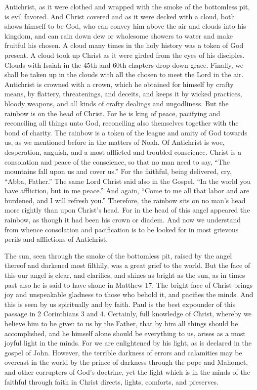 Antichrist, as it were clothed and wrapped with the smoke of the bottomless pit, is evil favored. And Christ covered and as it were decked with a cloud, both shows himself to be God, who can convey him above the air and clouds into his kingdom, and can rain down dew or wholesome showers to water and make fruitful his chosen. A cloud many times in the holy history was a token of God present. A cloud took up Christ as it were girded from the eyes of his disciples. Clouds with Isaiah in the 45th and 60th chapters drop down grace. Finally, we shall be taken up in the clouds with all the chosen to meet the Lord in the air. Antichrist is crowned with a crown, which he obtained for himself by crafty means, by flattery, threatenings, and deceits, and keeps it by wicked practices, bloody weapons, and all kinds of crafty dealings and ungodliness. But the rainbow is on the head of Christ. For he is king of peace, pacifying and reconciling all things unto God, reconciling also themselves together with the bond of charity. The rainbow is a token of the league and amity of God towards us, as we mentioned before in the matters of Noah. Of Antichrist is woe, desperation, anguish, and a most afflicted and troubled conscience. Christ is a consolation and peace of the conscience, so that no man need to say, “The mountains fall upon us and cover us.” For the faithful, being delivered, cry, “Abba, Father.” The same Lord Christ said also in the Gospel, “In the world you have affliction, but in me peace.” And again, “Come to me all that labor and are burdened, and I will refresh you.” Therefore, the rainbow sits on no man’s head more rightly than upon Christ’s head. For in the head of this angel appeared the rainbow, as though it had been his crown or diadem. And now we understand from whence consolation and pacification is to be looked for in most grievous perils and afflictions of Antichrist.

The sun, seen through the smoke of the bottomless pit, raised by the angel thereof and darkened most filthily, was a great grief to the world. But the face of this our angel is clear, and clarifies, and shines as bright as the sun, as in times past also he is said to have shone in Matthew 17. The bright face of Christ brings joy and unspeakable gladness to those who behold it, and pacifies the minds. And this is seen by us spiritually and by faith. Paul is the best expounder of this passage in 2 Corinthians 3 and 4. Certainly, full knowledge of Christ, whereby we believe him to be given to us by the Father, that by him all things should be accomplished, and he himself alone should be everything to us, arises as a most joyful light in the minds. For we are enlightened by his light, as is declared in the gospel of John. However, the terrible darkness of errors and calamities may be overcast in the world by the prince of darkness through the pope and Mahomet, and other corrupters of God’s doctrine, yet the light which is in the minds of the faithful through faith in Christ directs, lights, comforts, and preserves.

